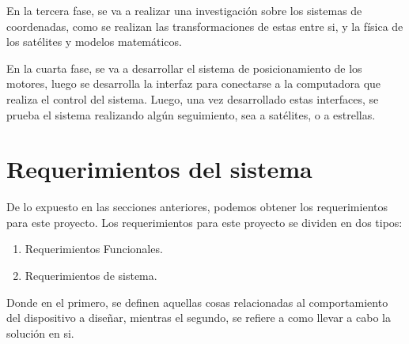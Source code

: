 En la tercera fase, se va a realizar una investigación sobre los sistemas de coordenadas, como se realizan las transformaciones de estas entre si, y la física de los satélites y modelos matemáticos.

En la cuarta fase, se va a desarrollar el sistema de posicionamiento de los motores, luego se desarrolla la interfaz para conectarse a la computadora que realiza el control del sistema. Luego, una vez desarrollado estas interfaces, se prueba el sistema realizando algún seguimiento, sea a satélites, o a estrellas.  



















\section{ Requerimientos del sistema} \label{req_sist}

De lo expuesto en las secciones anteriores, podemos obtener los requerimientos para este proyecto. Los requerimientos para este proyecto se dividen en dos tipos:  
\begin{enumerate}
	\item Requerimientos Funcionales.  
	\item Requerimientos de sistema. 
\end{enumerate} 
Donde en el primero, se definen aquellas cosas relacionadas al comportamiento del dispositivo a diseñar, mientras el segundo, se refiere a como llevar a cabo la solución en si. 


\renewcommand{\arraystretch}{1.5}

